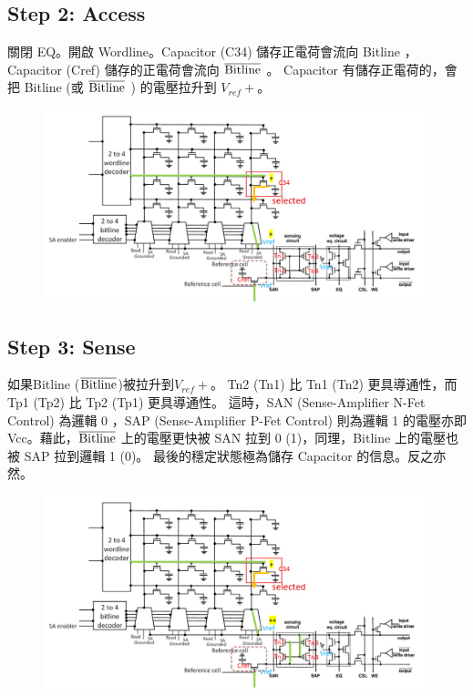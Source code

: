 \documentclass{article}
\begin{document}
\subsection*{Step 2: Access}

關閉 EQ。開啟 Wordline。Capacitor (C34) 儲存正電荷會流向 Bitline ， Capacitor (Cref) 儲存的正電荷會流向  $\rm{\overline{Bitline}}$ 。 Capacitor 有儲存正電荷的，會把 Bitline (或 $\rm{\overline{Bitline}}$ ) 的電壓拉升到 $V_{ref}+$。

\begin{figure}[H]
  \centering
  \includegraphics[width =\linewidth]{./img/2023-12-24-16-27-36.png}
  \end{figure}

\subsection*{Step 3: Sense}

如果Bitline ($\rm\overline{Bitline}$)被拉升到$V_{ref}+$。
Tn2 (Tn1) 比 Tn1 (Tn2) 更具導通性，而 Tp1 (Tp2) 比 Tp2 (Tp1) 更具導通性。
這時，SAN (Sense-Amplifier N-Fet Control) 為邏輯 0 ，SAP (Sense-Amplifier P-Fet Control) 則為邏輯 1 的電壓亦即 Vcc。藉此，$\rm\overline{Bitline}$ 上的電壓更快被 SAN 拉到 0 (1)，同理，Bitline 上的電壓也被 SAP 拉到邏輯 1 (0)。 最後的穩定狀態極為儲存 Capacitor 的信息。反之亦然。

\begin{figure}[H]
  \centering
  \includegraphics[width = \linewidth]{./img/2023-12-24-16-29-34.png}
  \end{figure}
\end{document}
